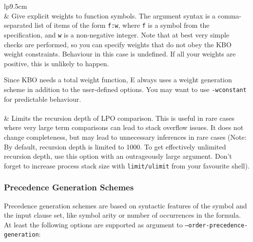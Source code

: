 \documentclass{article}
\begin{document}
\begin{supertabular}{lp{9.5cm}}
  \\
  & Give explicit weights to function symbols. The argument syntax is
  a comma-separated list of items of the form \texttt{f:w}, where
  \texttt{f} is a symbol from the specification, and \texttt{w} is a
  non-negative integer. Note that at best very simple checks are
  performed, so you can specify weights that do not obey the KBO
  weight constraints. Behaviour in this case is undefined. If all your
  weights are positive, this is unlikely to happen.

  Since KBO needs a total weight function, E always uses a weight
  generation scheme in addition to the user-defined options. You may
  want to use \texttt{-wconstant} for predictable behaviour.\\[1ex]

  \\
  & Limits the recursion depth of LPO comparison. This is useful in rare
  cases where very large term comparisons can lead to stack overflow
  issues. It does not change completeness, but may lead to unnecessary
  inferences in rare cases (Note: By default, recursion depth is
  limited to 1000. To get effectively unlimited recursion depth, use
  this option with an outrageously large argument. Don't forget to
  increase process stack size with \texttt{limit/ulimit} from your
  favourite shell).\\
\end{supertabular}

\subsubsection{Precedence Generation Schemes}

Precedence generation schemes are based on syntactic features of the
symbol and the input clause set, like symbol arity or number of
occurrences in the formula. At least the following options are
supported as argument to \texttt{--order-precedence-generation}:
\end{document}
